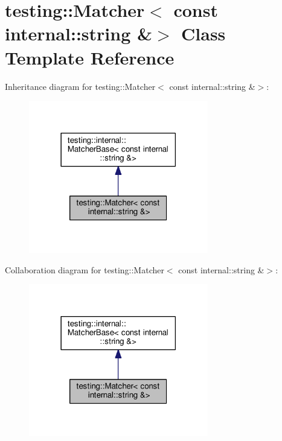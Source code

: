\hypertarget{classtesting_1_1_matcher_3_01const_01internal_1_1string_01_6_4}{}\section{testing\+:\+:Matcher$<$ const internal\+:\+:string \&$>$ Class Template Reference}
\label{classtesting_1_1_matcher_3_01const_01internal_1_1string_01_6_4}


Inheritance diagram for testing\+:\+:Matcher$<$ const internal\+:\+:string \&$>$\+:
\nopagebreak
\begin{figure}[H]
\begin{center}
\leavevmode
\includegraphics[width=222pt]{classtesting_1_1_matcher_3_01const_01internal_1_1string_01_6_4__inherit__graph}
\end{center}
\end{figure}


Collaboration diagram for testing\+:\+:Matcher$<$ const internal\+:\+:string \&$>$\+:
\nopagebreak
\begin{figure}[H]
\begin{center}
\leavevmode
\includegraphics[width=222pt]{classtesting_1_1_matcher_3_01const_01internal_1_1string_01_6_4__coll__graph}
\end{center}
\end{figure}
